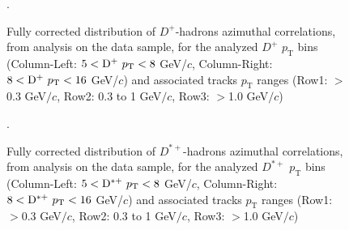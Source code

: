 \begin{figure}[h]
\centering
\caption{Fully corrected distribution of $D^+$-hadrons azimuthal correlations, from analysis on the data sample, for the analyzed $D^+$ $p_\text{T}$ bins (Column-Left: $5 < {\rm D^+} \ p_\text{T} < 8$ GeV/$c$, Column-Right: $8 < {\rm D^+} \ p_\text{T} < 16$ GeV/$c$) and associated tracks $p_\text{T}$ ranges (Row1: $>$0.3 GeV$/c$, Row2: 0.3 to 1 GeV$/c$, Row3: $>$1.0 GeV$/c$)}.
\label{fig:Data_Res_DPlus}
\end{figure}

\begin{figure}[h]
\centering
\caption{Fully corrected distribution of $D^{*+}$-hadrons azimuthal correlations, from analysis on the data sample, for the analyzed $D^{*+}$ $p_\text{T}$ bins (Column-Left: $5 < {\rm D^{*+}} \ p_\text{T} < 8$ GeV/$c$, Column-Right: $8 < {\rm D^{*+}} \ p_\text{T} < 16$ GeV/$c$) and associated tracks $p_\text{T}$ ranges (Row1: $>$0.3 GeV$/c$, Row2: 0.3 to 1 GeV$/c$, Row3: $>$1.0 GeV$/c$)}.
\label{fig:Data_Res_DStar}
\end{figure}

